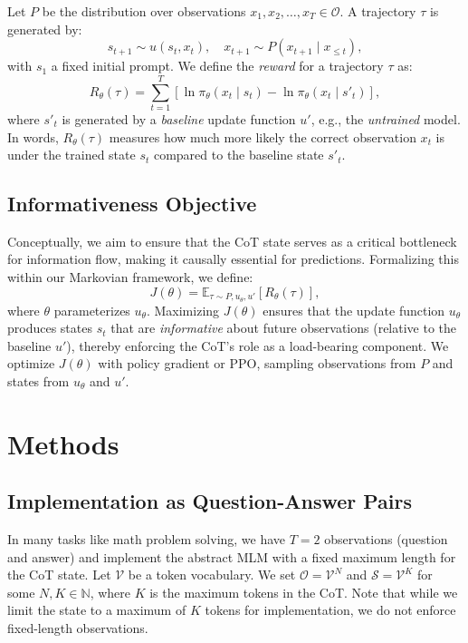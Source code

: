 \documentclass[letterpaper]{article} %
\begin{document}
Let $P$ be the distribution over observations $x_1, x_2, \dots, x_T \in \mathcal{O}$. A trajectory $\tau$ is generated by:
\[
s_{t+1}\sim u(s_t, x_t), \quad x_{t+1}\sim P(x_{t+1}\mid x_{\le t}),
\]
with $s_1$ a fixed initial prompt. We define the \emph{reward} for a trajectory $\tau$ as:
\[
R_\theta(\tau)=\sum_{t=1}^T \left[\ln \pi_\theta(x_t\mid s_t)-\ln \pi_\theta(x_t\mid s'_t)\right],
\]
where $s'_t$ is generated by a \emph{baseline} update function $u'$, e.g., the \emph{untrained} model. In words, $R_\theta(\tau)$ measures how much more likely the correct observation $x_t$ is under the trained state $s_t$ compared to the baseline state $s'_t$.

\subsection{Informativeness Objective}

Conceptually, we aim to ensure that the CoT state serves as a critical bottleneck for information flow, making it causally essential for predictions. Formalizing this within our Markovian framework, we define:
\[
  J(\theta)=\mathbb{E}_{\tau \sim P,u_\theta,u'}\left[R_\theta(\tau)\right],
\]
where $\theta$ parameterizes $u_\theta$. Maximizing $J(\theta)$ ensures that the update function $u_\theta$ produces states $s_t$ that are \emph{informative} about future observations (relative to the baseline $u'$), thereby enforcing the CoT's role as a load-bearing component. We optimize $J(\theta)$ with policy gradient or PPO, sampling observations from $P$ and states from $u_\theta$ and $u'$.

\section{Methods}
\label{sec:method}

\subsection{Implementation as Question-Answer Pairs}
In many tasks like math problem solving, we have $T=2$ observations (question and answer) and implement the abstract MLM with a fixed maximum length for the CoT state. Let $\mathcal{V}$ be a token vocabulary. We set $\mathcal{O} = \mathcal{V}^N$ and $\mathcal{S} = \mathcal{V}^K$ for some $N, K \in \mathbb{N}$, where $K$ is the maximum tokens in the CoT. Note that while we limit the state to a maximum of $K$ tokens for implementation, we do not enforce fixed-length observations. 
\end{document}
